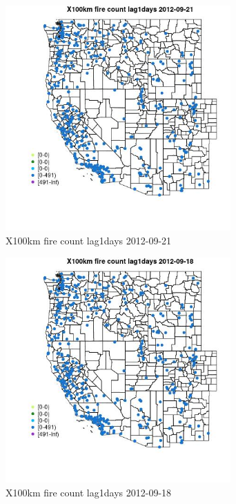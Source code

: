 \begin{figure} 
\centering  
\includegraphics[width=0.77\textwidth]{Code_Outputs/Report_ML_input_PM25_Step4_part_e_de_duplicated_aves_compiled_2019-05-14wNAs_MapObsX100km_fire_count_lag1days2012-09-21.jpg} 
\caption{\label{fig:Report_ML_input_PM25_Step4_part_e_de_duplicated_aves_compiled_2019-05-14wNAsMapObsX100km_fire_count_lag1days2012-09-21}X100km fire count lag1days 2012-09-21} 
\end{figure} 
 

\clearpage 

\begin{figure} 
\centering  
\includegraphics[width=0.77\textwidth]{Code_Outputs/Report_ML_input_PM25_Step4_part_e_de_duplicated_aves_compiled_2019-05-14wNAs_MapObsX100km_fire_count_lag1days2012-09-18.jpg} 
\caption{\label{fig:Report_ML_input_PM25_Step4_part_e_de_duplicated_aves_compiled_2019-05-14wNAsMapObsX100km_fire_count_lag1days2012-09-18}X100km fire count lag1days 2012-09-18} 
\end{figure} 
 

